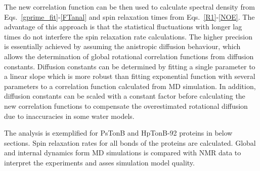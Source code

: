 \documentclass[pre,aps,floatfix,authordate1-4,twocolumn]{revtex4-1}
\begin{document}
The new correlation function can be then used to calculate spectral
density from Eqs.~\ref{gprime_fit}-\ref{FTanal} and spin relaxation
times from Eqs.~\ref{R1}-\ref{NOE}.
The advantage of this approach is that the statistical fluctuations
with longer lag times do not interfere the spin relaxation rate calculations.
The higher precision is essentially achieved by assuming the anistropic
diffusion behaviour, which allows the determination of global rotational
correlation functions from diffusion constants. Diffusion constants
can be determined by fitting a single parameter to a linear slope which is
more robust than fitting exponential function with several parameters to
a correlation function calculated from MD simulation.
In addition, diffusion constants can be scaled with a constant
factor before calculating the new correlation functions to compensate
the overestimated rotational diffusion due to inaccuracies in some
water models.

The analysis is exemplified for PsTonB and HpTonB-92 proteins in below sections.
Spin relaxation rates for all bonds of the proteins are calculated.
Global and internal dynamics form MD simulations is compared with
NMR data to interpret the experiments and asses simulation model quality.


\end{document}
